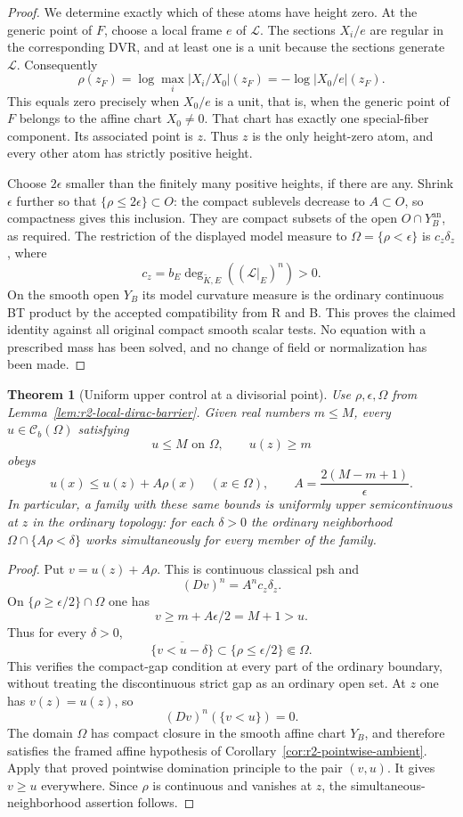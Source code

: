 \documentclass[11pt,a4paper]{article}
\numberwithin{equation}{section}
\newtheorem{theorem}{Theorem}[section]
\theoremstyle{definition}
\theoremstyle{remark}
\newcommand{\Cb}{\mathcal C_b}
\newcommand{\an}{\mathrm{an}}
\begin{document}
\begin{proof}
We determine exactly which of these atoms have height zero.
At the generic point of $F$, choose a local frame $e$ of
$\mathscr L$. The sections $X_i/e$ are regular in the
corresponding DVR, and at least one is a unit because the sections
generate $\mathscr L$. Consequently
\[
 \rho(z_F)
  =\log\max_i|X_i/X_0|(z_F)
  =-\log|X_0/e|(z_F).
\]
This equals zero precisely when $X_0/e$ is a unit, that is,
when the generic point of $F$ belongs to the affine chart
$X_0\ne0$. That chart has exactly one special-fiber component.
Its associated point is $z$. Thus $z$ is the only height-zero
atom, and every other atom has strictly positive height.

Choose $2\epsilon$ smaller than the finitely many positive
heights, if there are any. Shrink $\epsilon$ further so that
$\{\rho\leq2\epsilon\}\subset O$: the compact sublevels
decrease to $A\subset O$, so compactness gives this inclusion.
They are compact subsets of the open $O\cap Y_B^{\an}$, as
required. The restriction of the displayed model measure to
$\Omega=\{\rho<\epsilon\}$ is $c_z\delta_z$, where
\[
 c_z=b_E\deg_{\widetilde K,E}((\mathscr L|_E)^n)>0.
\]
On the smooth open $Y_B$ its model curvature measure is the
ordinary continuous BT product by the accepted compatibility
from R and B. This proves the claimed identity against all
original compact smooth scalar tests. No equation with a
prescribed mass has been solved, and no change of field or
normalization has been made.
\end{proof}

\begin{theorem}[Uniform upper control at a divisorial point]
\label{thm:r2-divisorial-upper-control}
Use $\rho,\epsilon,\Omega$ from
Lemma~\ref{lem:r2-local-dirac-barrier}. Given real numbers
$m\leq M$, every $u\in\Cb(\Omega)$ satisfying
\[
 u\leq M\text{ on }\Omega,\qquad u(z)\geq m
\]
obeys
\[
 u(x)\leq u(z)+A\rho(x)\quad(x\in\Omega),
 \qquad A=\frac{2(M-m+1)}\epsilon.
\]
In particular, a family with these same bounds is uniformly
upper semicontinuous at $z$ in the ordinary topology: for each
$\delta>0$ the ordinary neighborhood
$\Omega\cap\{A\rho<\delta\}$ works simultaneously for
every member of the family.
\end{theorem}

\begin{proof}
Put $v=u(z)+A\rho$. This is continuous classical psh and
\[
 (Dv)^n=A^n c_z\delta_z.
\]
On $\{\rho\geq\epsilon/2\}\cap\Omega$ one has
\[
 v\geq m+A\epsilon/2=M+1>u.
\]
Thus for every $\delta>0$,
\[
 \overline{\{v<u-\delta\}}
     \subset\{\rho\leq\epsilon/2\}\Subset\Omega.
\]
This verifies the compact-gap condition at every part of the
ordinary boundary, without treating the discontinuous strict
gap as an ordinary open set. At $z$ one has $v(z)=u(z)$, so
\[
 (Dv)^n(\{v<u\})=0.
\]
The domain $\Omega$ has compact closure in the smooth affine
chart $Y_B$, and therefore satisfies the framed affine
hypothesis of Corollary~\ref{cor:r2-pointwise-ambient}.
Apply that proved pointwise domination principle to the pair
$(v,u)$. It gives $v\geq u$ everywhere. Since $\rho$ is
continuous and vanishes at $z$, the simultaneous-neighborhood
assertion follows.
\end{proof}
\end{document}
